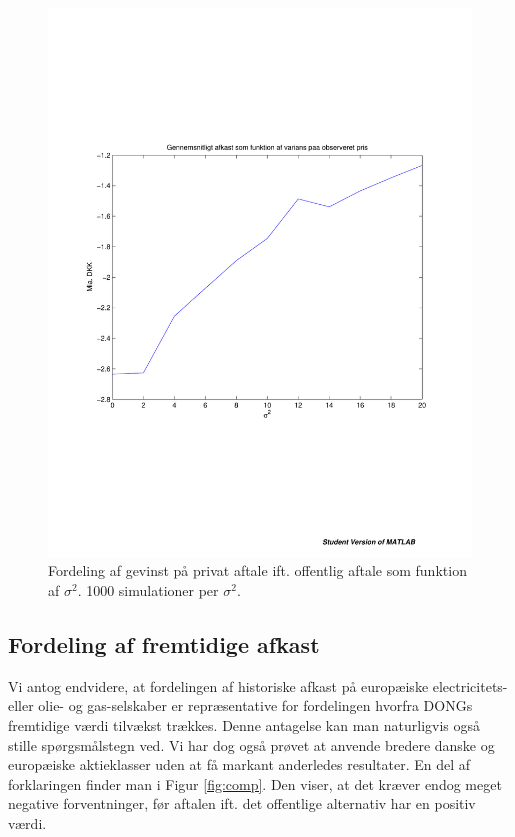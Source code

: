 \documentclass{article}
\begin{document}
 \begin{figure}
\includegraphics[scale=0.8]{../matlab/figs/return_variance.pdf}
\caption{Fordeling af gevinst p\aa{} privat aftale ift. offentlig aftale som funktion af $\sigma^2$. 1000 simulationer per $\sigma^2$. }
\label{fig:usikkerhed}
\end{figure}


\subsection{Fordeling af fremtidige afkast}

Vi antog endvidere, at fordelingen af historiske afkast på europæiske electricitets- eller olie- og gas-selskaber er repræsentative for fordelingen hvorfra DONGs fremtidige værdi tilvækst trækkes. Denne antagelse kan man naturligvis også stille spørgsmålstegn ved. Vi har dog også prøvet at anvende bredere danske og europæiske aktieklasser uden at få markant anderledes resultater. En del af forklaringen finder man i Figur \ref{fig:comp}. Den viser, at det kræver endog meget negative forventninger, før aftalen ift. det offentlige alternativ har en positiv værdi.
\end{document}
